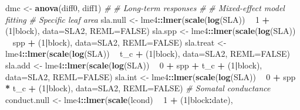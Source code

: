 \documentclass[]{scrartcl}
\newenvironment{Shaded}{\begin{snugshade}}{\end{snugshade}}
\newcommand{\CommentTok}[1]{\textcolor[rgb]{0.56,0.35,0.01}{\textit{#1}}}
\newcommand{\DataTypeTok}[1]{\textcolor[rgb]{0.13,0.29,0.53}{#1}}
\newcommand{\DecValTok}[1]{\textcolor[rgb]{0.00,0.00,0.81}{#1}}
\newcommand{\KeywordTok}[1]{\textcolor[rgb]{0.13,0.29,0.53}{\textbf{#1}}}
\newcommand{\NormalTok}[1]{#1}
\newcommand{\OperatorTok}[1]{\textcolor[rgb]{0.81,0.36,0.00}{\textbf{#1}}}
\newcommand{\OtherTok}[1]{\textcolor[rgb]{0.56,0.35,0.01}{#1}}
\newcommand{\StringTok}[1]{\textcolor[rgb]{0.31,0.60,0.02}{#1}}
\begin{document}
\begin{Shaded}
\begin{Highlighting}[]
{{{{{{{{{{{{\NormalTok{    dmc <-}\StringTok{ }\KeywordTok{anova}\NormalTok{(diff0, diff1)}
\CommentTok{#}
\CommentTok{#  Long-term responses}
\CommentTok{#}
\CommentTok{# Mixed-effect model fitting}
  \CommentTok{# Specific leaf area}
\NormalTok{    sla.null <-}\StringTok{ }\NormalTok{lme4}\OperatorTok{::}\KeywordTok{lmer}\NormalTok{(}\KeywordTok{scale}\NormalTok{(}\KeywordTok{log}\NormalTok{(SLA)) }\OperatorTok{~}\StringTok{ }\DecValTok{1} \OperatorTok{+}\StringTok{ }\NormalTok{(}\DecValTok{1}\OperatorTok{|}\NormalTok{block), }
                           \DataTypeTok{data=}\NormalTok{SLA2, }\DataTypeTok{REML=}\OtherTok{FALSE}\NormalTok{)}
\NormalTok{    sla.spp <-}\StringTok{ }\NormalTok{lme4}\OperatorTok{::}\KeywordTok{lmer}\NormalTok{(}\KeywordTok{scale}\NormalTok{(}\KeywordTok{log}\NormalTok{(SLA)) }\OperatorTok{~}\StringTok{ }\NormalTok{spp }\OperatorTok{+}\StringTok{ }\NormalTok{(}\DecValTok{1}\OperatorTok{|}\NormalTok{block), }
                          \DataTypeTok{data=}\NormalTok{SLA2, }\DataTypeTok{REML=}\OtherTok{FALSE}\NormalTok{)}
\NormalTok{    sla.treat <-}\StringTok{ }\NormalTok{lme4}\OperatorTok{::}\KeywordTok{lmer}\NormalTok{(}\KeywordTok{scale}\NormalTok{(}\KeywordTok{log}\NormalTok{(SLA)) }\OperatorTok{~}\StringTok{ }\NormalTok{t_c }\OperatorTok{+}\StringTok{ }\NormalTok{(}\DecValTok{1}\OperatorTok{|}\NormalTok{block), }
                            \DataTypeTok{data=}\NormalTok{SLA2, }\DataTypeTok{REML=}\OtherTok{FALSE}\NormalTok{)}
\NormalTok{    sla.add <-}\StringTok{ }\NormalTok{lme4}\OperatorTok{::}\KeywordTok{lmer}\NormalTok{(}\KeywordTok{scale}\NormalTok{(}\KeywordTok{log}\NormalTok{(SLA)) }\OperatorTok{~}\StringTok{ }\DecValTok{0} \OperatorTok{+}\StringTok{ }\NormalTok{spp }\OperatorTok{+}\StringTok{ }\NormalTok{t_c }\OperatorTok{+}\StringTok{ }\NormalTok{(}\DecValTok{1}\OperatorTok{|}\NormalTok{block), }
                          \DataTypeTok{data=}\NormalTok{SLA2, }\DataTypeTok{REML=}\OtherTok{FALSE}\NormalTok{)}
\NormalTok{    sla.int <-}\StringTok{ }\NormalTok{lme4}\OperatorTok{::}\KeywordTok{lmer}\NormalTok{(}\KeywordTok{scale}\NormalTok{(}\KeywordTok{log}\NormalTok{(SLA)) }\OperatorTok{~}\StringTok{ }\DecValTok{0} \OperatorTok{+}\StringTok{ }\NormalTok{spp }\OperatorTok{*}\StringTok{ }\NormalTok{t_c }\OperatorTok{+}\StringTok{ }\NormalTok{(}\DecValTok{1}\OperatorTok{|}\NormalTok{block), }
                          \DataTypeTok{data=}\NormalTok{SLA2, }\DataTypeTok{REML=}\OtherTok{FALSE}\NormalTok{)}
  \CommentTok{# Somatal conductance}
\NormalTok{    conduct.null <-}\StringTok{ }\NormalTok{lme4}\OperatorTok{::}\KeywordTok{lmer}\NormalTok{(}\KeywordTok{scale}\NormalTok{(lcond) }\OperatorTok{~}\StringTok{ }\DecValTok{1} \OperatorTok{+}\StringTok{ }\NormalTok{(}\DecValTok{1}\OperatorTok{|}\NormalTok{block}\OperatorTok{:}\NormalTok{date),}
}}}}}}}}}}}}
\end{Highlighting}
\end{Shaded}
\end{document}
